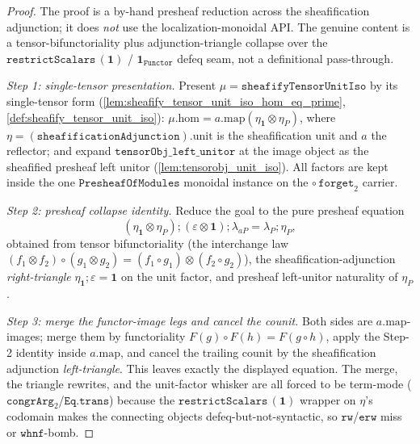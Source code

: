 \begin{proof}
  \leanok
  The proof is a by-hand presheaf reduction across the sheafification adjunction; it does \emph{not}
  use the localization-monoidal API. The genuine content is a tensor-bifunctoriality plus
  adjunction-triangle collapse over the \(\mathtt{restrictScalars}\,(\mathbf 1)\) / \(\mathbf 1_{\mathtt{Functor}}\)
  defeq seam, not a definitional pass-through.

  \emph{Step 1: single-tensor presentation.} Present
  \(\mu = \mathtt{sheafifyTensorUnitIso}\) by its single-tensor form
  (\cref{lem:sheafify_tensor_unit_iso_hom_eq_prime}, \cref{def:sheafify_tensor_unit_iso}):
  \(\mu.\mathrm{hom} = a.\mathrm{map}(\eta_{\mathbf 1} \otimes \eta_P)\), where
  \(\eta = (\mathtt{sheafificationAdjunction}).\mathrm{unit}\) is the sheafification unit and \(a\) the
  reflector; and expand \(\mathtt{tensorObj\_left\_unitor}\) at the image object as the sheafified
  presheaf left unitor (\cref{lem:tensorobj_unit_iso}). All factors are kept inside the one
  \(\mathtt{PresheafOfModules}\) monoidal instance on the \(\circ\,\mathtt{forget}_2\) carrier.

  \emph{Step 2: presheaf collapse identity.} Reduce the goal to the pure presheaf equation
  \[
    (\eta_{\mathbf 1} \otimes \eta_P) \mathbin{;} (\varepsilon \otimes \mathbf 1) \mathbin{;} \lambda_{aP}
      = \lambda_P \mathbin{;} \eta_P ,
  \]
  obtained from tensor bifunctoriality (the interchange law
  \((f_1\otimes f_2)\circ(g_1\otimes g_2) = (f_1\circ g_1)\otimes(f_2\circ g_2)\)), the
  sheafification-adjunction \emph{right-triangle} \(\eta_{\mathbf 1}\mathbin{;}\varepsilon = \mathbf 1\)
  on the unit factor, and presheaf left-unitor naturality of \(\eta_P\).

  \emph{Step 3: merge the functor-image legs and cancel the counit.} Both sides are
  \(a.\mathrm{map}\)-images; merge them by functoriality \(F(g)\circ F(h)=F(g\circ h)\), apply the
  Step-2 identity inside \(a.\mathrm{map}\), and cancel the trailing counit by the sheafification
  adjunction \emph{left-triangle}. This leaves exactly the displayed equation. The merge, the
  triangle rewrites, and the unit-factor whisker are all forced to be term-mode
  (\(\mathtt{congrArg}_2\)/\(\mathtt{Eq.trans}\)) because the \(\mathtt{restrictScalars}\,(\mathbf 1)\)
  wrapper on \(\eta\)'s codomain makes the connecting objects defeq-but-not-syntactic, so
  \(\mathtt{rw}\)/\(\mathtt{erw}\) miss or \(\mathtt{whnf}\)-bomb.
\end{proof}

